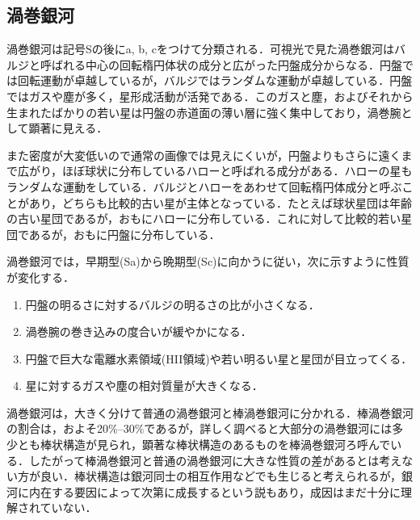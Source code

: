 \subsection{渦巻銀河}

渦巻銀河は記号Sの後にa, b, cをつけて分類される．可視光で見た渦巻銀河はバルジと呼ばれる中心の回転楕円体状の成分と広がった円盤成分からなる．円盤では回転運動が卓越しているが，バルジではランダムな運動が卓越している．円盤ではガスや塵が多く，星形成活動が活発である．このガスと塵，およびそれから生まれたばかりの若い星は円盤の赤道面の薄い層に強く集中しており，渦巻腕として顕著に見える．

また密度が大変低いので通常の画像では見えにくいが，円盤よりもさらに遠くまで広がり，ほぼ球状に分布しているハローと呼ばれる成分がある．ハローの星もランダムな運動をしている．バルジとハローをあわせて回転楕円体成分と呼ぶことがあり，どちらも比較的古い星が主体となっている．たとえば球状星団は年齢の古い星団であるが，おもにハローに分布している．これに対して比較的若い星団であるが，おもに円盤に分布している．

渦巻銀河では，早期型(Sa)から晩期型(Sc)に向かうに従い，次に示すように性質が変化する．

\begin{enumerate}[(1)]
	\item 円盤の明るさに対するバルジの明るさの比が小さくなる．
	\item 渦巻腕の巻き込みの度合いが緩やかになる．
	\item 円盤で巨大な電離水素領域(HII領域)や若い明るい星と星団が目立ってくる．
	\item 星に対するガスや塵の相対質量が大きくなる．
\end{enumerate}

渦巻銀河は，大きく分けて普通の渦巻銀河と棒渦巻銀河に分かれる．棒渦巻銀河の割合は，およそ20\%--30\%であるが，詳しく調べると大部分の渦巻銀河には多少とも棒状構造が見られ，顕著な棒状構造のあるものを棒渦巻銀河ろ呼んでいる．したがって棒渦巻銀河と普通の渦巻銀河に大きな性質の差があるとは考えない方が良い．棒状構造は銀河同士の相互作用などでも生じると考えられるが，銀河に内在する要因によって次第に成長するという説もあり，成因はまだ十分に理解されていない．